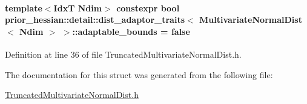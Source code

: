 \paragraph[{\texorpdfstring{adaptable\+\_\+bounds}{adaptable_bounds}}]{\setlength{\rightskip}{0pt plus 5cm}template$<$IdxT Ndim$>$ constexpr bool {\bf prior\+\_\+hessian\+::detail\+::dist\+\_\+adaptor\+\_\+traits}$<$ {\bf Multivariate\+Normal\+Dist}$<$ Ndim $>$ $>$\+::adaptable\+\_\+bounds = false\hspace{0.3cm}{\ttfamily [static]}}\hypertarget{structprior__hessian_1_1detail_1_1dist__adaptor__traits_3_01MultivariateNormalDist_3_01Ndim_01_4_01_4_a17273f68ee0cf8fb1f56166c08611948}{}\label{structprior__hessian_1_1detail_1_1dist__adaptor__traits_3_01MultivariateNormalDist_3_01Ndim_01_4_01_4_a17273f68ee0cf8fb1f56166c08611948}


Definition at line 36 of file Truncated\+Multivariate\+Normal\+Dist.\+h.



The documentation for this struct was generated from the following file\+:\begin{DoxyCompactItemize}
\item 
\hyperlink{TruncatedMultivariateNormalDist_8h}{Truncated\+Multivariate\+Normal\+Dist.\+h}\end{DoxyCompactItemize}
